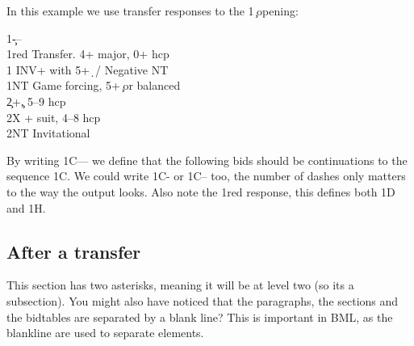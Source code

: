 \documentclass[a4paper]{article}
\begin{document}
In this example we use transfer responses to the 1\c\ opening:

\begin{bidtable}
1\c---\\
1red \> Transfer. 4+ major, 0+ hcp\\
1\s \> INV+ with 5+\d\ / Negative NT\\
1NT \> Game forcing, 5+\c\ or balanced\\
2\c {}+\c, 5--9 hcp\\
2X + suit, 4--8 hcp\\
2NT \> Invitational
\end{bidtable}

By writing 1C--- we define that the following bids should be
continuations to the sequence 1C. We could write 1C- or 1C-- too,
the number of dashes only matters to the way the output looks. Also
note the 1red response, this defines both 1D and 1H.

\subsection{After a transfer}

This section has two asterisks, meaning it will be at level two
(so its a subsection). You might also have noticed that the
paragraphs, the sections and the bidtables are separated by a
blank line? This is important in BML, as the blankline are used to
separate elements.
\end{document}
